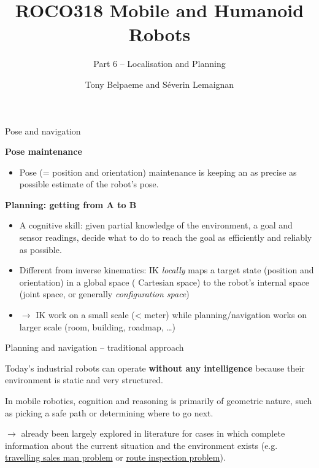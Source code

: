 \documentclass[compress,xcolor=table]{beamer}
\title{ROCO318 \newline Mobile and Humanoid Robots}
\subtitle{Part 6 -- Localisation and Planning}
\date{}
\author{Tony Belpaeme and Séverin Lemaignan}
\institute{Centre for Neural Systems and Robotics\\{\bf Plymouth University}}
\begin{document}

\maketitle

\begin{frame}{Pose and navigation}

    \textbf{Pose maintenance}

    \begin{itemize}
        \item Pose (= position and orientation) maintenance is
            keeping an as precise as possible estimate of the robot's pose.
    \end{itemize}

    \pause

    \textbf{Planning: getting from A to B}

    \begin{itemize}
        \item A cognitive skill: given partial knowledge of the environment, a
            goal and sensor readings, decide what to do to reach the goal as
            efficiently and reliably as possible.

        \item Different from inverse kinematics: IK \emph{locally} maps a
            target state (position and orientation) in a global space (\eg
            Cartesian space) to the robot's internal space (joint space, or
            generally \emph{configuration space})

        \item $\rightarrow$ IK work on a small scale (\textless{} meter) while
            planning/navigation works on larger scale (room, building, roadmap,
            \ldots{})

    \end{itemize}

\end{frame}

\begin{frame}{Planning and navigation -- traditional approach}

    Today's industrial robots can operate \textbf{without any intelligence} because
    their environment is static and very structured.

    In mobile robotics, cognition and reasoning is primarily of geometric
    nature, such as picking a safe path or determining where to go next.

    $\rightarrow$ already been largely explored in literature for cases in
    which complete information about the current situation and the environment
    exists (e.g.
    \href{http://en.wikipedia.org/wiki/Travelling_salesman_problem}{travelling
    sales man problem} or
    \href{http://en.wikipedia.org/wiki/Route_inspection_problem}{route
    inspection problem}).

\end{frame}
\end{document}
